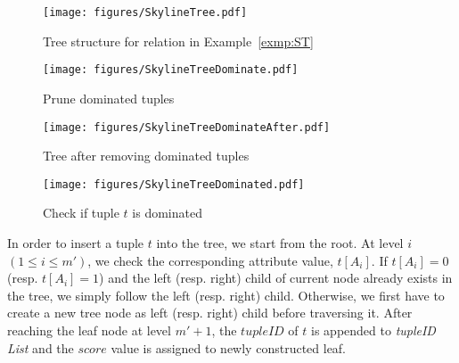\begin{figure*}[!t]
\begin{minipage}[t]{0.23\linewidth}
\centering
    \texttt{[image: figures/SkylineTree.pdf]}
    \caption{Tree structure for relation in Example~\ref{exmp:ST}}
    \label{fig:tree}
\end{minipage}
\hspace{1mm}
\begin{minipage}[t]{0.23\linewidth}
\centering
    \texttt{[image: figures/SkylineTreeDominate.pdf]}
    \caption{Prune dominated tuples}
    \label{fig:treePruneDominatedTuples}
\end{minipage}
\hspace{1mm}
\begin{minipage}[t]{0.23\linewidth}
\centering
    \texttt{[image: figures/SkylineTreeDominateAfter.pdf]}
    \caption{Tree after removing dominated tuples}
    \label{fig:treePruneDominatedTuplesAfter}
\end{minipage}
\hspace{1mm}
\begin{minipage}[t]{0.23\linewidth}
\centering
    \texttt{[image: figures/SkylineTreeDominated.pdf]}
    \caption{Check if tuple $t$ is dominated}
    \label{fig:treeCheckIfDominated}
\end{minipage}
\end{figure*}


\vspace{1mm}
 In order to insert a tuple $t$ into the tree, we start from the root. At level $i$ $(1 \leq i \leq m')$, we check the corresponding attribute value, $t[A_i]$. If $t[A_i] = 0$ (resp. $t[A_i] = 1$) and the left (resp. right) child of current node already exists in the tree, we simply follow the left (resp. right) child. Otherwise, we first have to create a new tree node as left (resp. right) child before traversing it. After reaching the leaf node at level $m'+1$, the $tupleID$ of $t$ is appended to \textit{tupleID List} and the $score$ value is assigned to newly constructed leaf.


